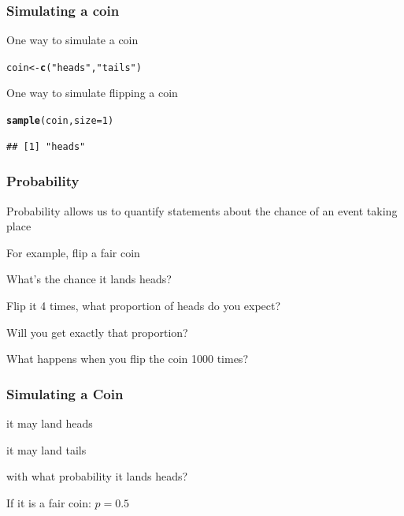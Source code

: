 \documentclass[12pt]{beamer}\usepackage[]{graphicx}\usepackage[]{color}
\makeatletter
\newcommand{\hlnum}[1]{\textcolor[rgb]{0.686,0.059,0.569}{#1}}%
\newcommand{\hlstr}[1]{\textcolor[rgb]{0.192,0.494,0.8}{#1}}%
\newcommand{\hlstd}[1]{\textcolor[rgb]{0.345,0.345,0.345}{#1}}%
\newcommand{\hlkwb}[1]{\textcolor[rgb]{0.69,0.353,0.396}{#1}}%
\newcommand{\hlkwc}[1]{\textcolor[rgb]{0.333,0.667,0.333}{#1}}%
\newcommand{\hlkwd}[1]{\textcolor[rgb]{0.737,0.353,0.396}{\textbf{#1}}}%
\newenvironment{kframe}{%
 \def\at@end@of@kframe{}%
 \ifinner\ifhmode%
  \def\at@end@of@kframe{\end{minipage}}%
  \begin{minipage}{\columnwidth}%
 \fi\fi%
 \def\FrameCommand##1{\hskip\@totalleftmargin \hskip-\fboxsep
 \colorbox{shadecolor}{##1}\hskip-\fboxsep
     \hskip-\linewidth \hskip-\@totalleftmargin \hskip\columnwidth}%
 \MakeFramed {\advance\hsize-\width
   \@totalleftmargin\z@ \linewidth\hsize
   \@setminipage}}%
 {\par\unskip\endMakeFramed%
 \at@end@of@kframe}
\newenvironment{knitrout}{}{} %
\makeatother
\begin{document}

\begin{frame}[fragile]
\frametitle{Simulating a coin}

One way to simulate a coin
\begin{knitrout}\footnotesize
{}\color{fgcolor}\begin{kframe}
\begin{alltt}
\hlstd{coin} \hlkwb{<-} \hlkwd{c}\hlstd{(}\hlstr{"heads"}\hlstd{,} \hlstr{"tails"}\hlstd{)}
\end{alltt}
\end{kframe}
\end{knitrout}

\pause
\bigskip
One way to simulate flipping a coin
\begin{knitrout}\footnotesize
{}\color{fgcolor}\begin{kframe}
\begin{alltt}
\hlkwd{sample}\hlstd{(coin,} \hlkwc{size} \hlstd{=} \hlnum{1}\hlstd{)}
\end{alltt}
\begin{verbatim}
## [1] "heads"
\end{verbatim}
\end{kframe}
\end{knitrout}

\end{frame}


\begin{frame}
\frametitle{Probability}

Probability allows us to quantify statements about the chance of an event taking place

\bigskip
For example, flip a fair coin
\bi
  \item What's the chance it lands heads?
  \item Flip it 4 times, what proportion of heads do you expect?
  \item Will you get exactly that proportion?
  \item What happens when you flip the coin 1000 times?
\ei

\end{frame}


\begin{frame}
\frametitle{Simulating a Coin}

\bbi
  \item it may land heads
  \item it may land tails
  \item with what probability it lands heads?
  \item If it is a fair coin: $p = 0.5$
\ei
\eb

\end{frame}
\end{document}
